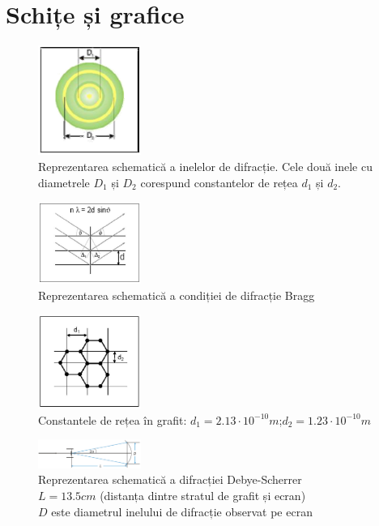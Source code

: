 \documentclass[a4paper]{article}
\begin{document}
\section{Schițe și grafice}

\begin{figure}[htbp]
	\centering
	\includegraphics[width=0.3\textwidth]{inele-difractie.png}
	\caption{Reprezentarea schematică a inelelor de difracție. Cele două inele cu
		diametrele $D_1$ și $D_2$ corespund constantelor de rețea $d_1$ și $d_2$.}
\end{figure}

\begin{figure}
	\centering
	\includegraphics[width=0.3\textwidth]{bragg.png}
	\caption{Reprezentarea schematică a condiției de difracție Bragg}
\end{figure}

\begin{figure}
	\centering
	\includegraphics[width=0.3\textwidth]{grafit.png}
	\caption{Constantele de rețea în grafit: $d_1 = 2.13 \cdot 10^{-10} m$;$d_2 = 1.23 \cdot 10^{-10} m$}
\end{figure}

\begin{figure}[htbp]
	\centering
	\includegraphics[width=0.3\textwidth]{difractie-debye-scherrer.png}
	\caption{Reprezentarea schematică a difracției Debye-Scherrer \\
		$L = 13.5 cm$ (distanța dintre stratul de grafit și ecran) \\
		$D$ este diametrul inelului de difracție observat pe ecran}
	\label{fig:difrac_Debye-Scherrer}
\end{figure}
\end{document}
